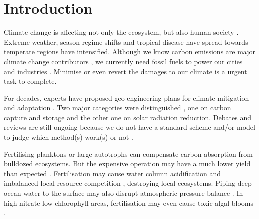 \documentclass[../thesis.tex]{subfiles} %
\begin{document}
\section{Introduction}

Climate change is affecting not only the ecosystem, but also human society \autocite{notz2016observed,schuur2015climate}.  Extreme weather, season regime shifts and tropical disease have spread towards temperate regions have intensified.  Although we know carbon emissions are major climate change contributors \autocite{notz2016observed}, we currently need fossil fuels to power our cities and industries \autocite{ferguson2000electricity}.  Minimise or even revert the damages to our climate is a urgent task to complete.

For decades, experts have proposed geo-engineering plans for climate mitigation and adaptation \autocite{farrelly2013carbon,yang2008progress,boyd2008ranking,boettcher2019high,vaughan2011review}.  Two major categories were distinguished \autocite{boyd2008ranking}, one on carbon capture and storage and the other one on solar radiation reduction.  Debates and reviews are still ongoing because we do not have a standard scheme and/or model to judge which method(s) work(s) or not \autocite{boyd2008ranking,boettcher2019high,boyd2016development,oschlies2017indicators,gattuso2018ocean}.

Fertilising planktons \autocite{gnanadesikan2008export,lovelock2007ocean,lawrence2014efficiency} or large autotrophs \autocite{duarte2017can,johannessen2016geoengineering,krause2016substantial} can compensate carbon absorption from bulldozed ecosystems.  But the expensive operation may have a much lower yield than expected \autocite{boyd2008implications,gnanadesikan2008export,oschlies2010side}.  Fertilisation may cause water column acidification \autocite{oschlies2010side} and imbalanced local resource competition \autocite{chung2011using,thiele2012microbial,batten2014did}, destroying local ecosystems.  Piping deep ocean water to the surface may also disrupt atmospheric pressure balance \autocite{kwiatkowski2015atmospheric}.  In high-nitrate-low-chlorophyll areas, fertilisation may even cause toxic algal blooms \autocite{trick2010iron}.
\end{document}
